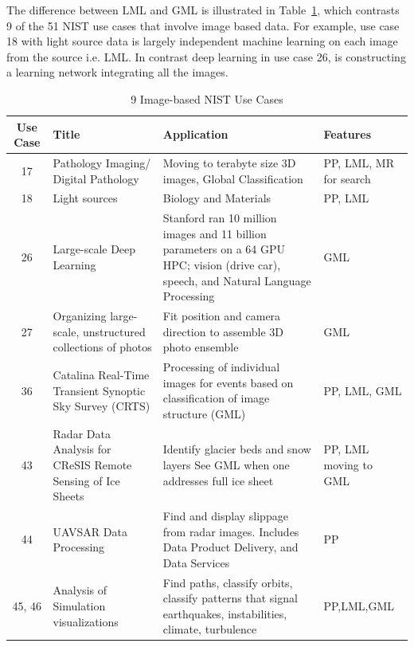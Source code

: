 \documentclass{acm_proc_article-sp}
\begin{document}
The difference between LML and GML is illustrated in Table~\ref{Table3}, which contrasts 9 of the 51 NIST use cases that involve image based data. For example, use case 18 with light source data is largely independent machine learning on each image from the source i.e. LML. In contrast deep learning in use case 26, is constructing a learning network integrating all the images.


\begin{table}
\centering
\caption{9 Image-based NIST Use Cases}
\label{Table3}
\begin{tabular}{|c|p{3cm}|p{7cm}|p{2cm}|} \hline
\textbf{Use Case} & \textbf{Title} & \textbf{Application} & \textbf{Features} \\ \hline
17 & Pathology Imaging/ Digital Pathology & Moving to terabyte size 3D images, Global Classification & PP, LML, MR for search \\ \hline
18 & Light sources & Biology and Materials & PP, LML \\ \hline
26 & Large-scale Deep Learning & Stanford ran 10 million images and 11 billion parameters on a 64 GPU HPC; vision (drive car), speech, and Natural Language Processing & GML \\ \hline
27 & Organizing large-scale, unstructured collections of photos & Fit position and camera direction to assemble 3D photo ensemble & GML \\ \hline
36 & Catalina Real-Time Transient Synoptic Sky Survey (CRTS) & Processing of individual images for events based on classification of image structure (GML) & PP, LML, GML \\ \hline
43 & Radar Data Analysis for CReSIS Remote Sensing of Ice Sheets & Identify glacier beds and snow layers \newline See GML when one addresses full ice sheet & PP, LML moving to GML \\ \hline
44 & UAVSAR Data Processing & Find and display slippage from radar images. Includes Data Product Delivery, and Data Services & PP \\ \hline
45, 46 & Analysis of Simulation visualizations & Find paths, classify orbits, classify patterns that signal earthquakes, instabilities, climate, turbulence & PP,LML,GML \\ \hline
\end{tabular}
\end{table}
\end{document}
